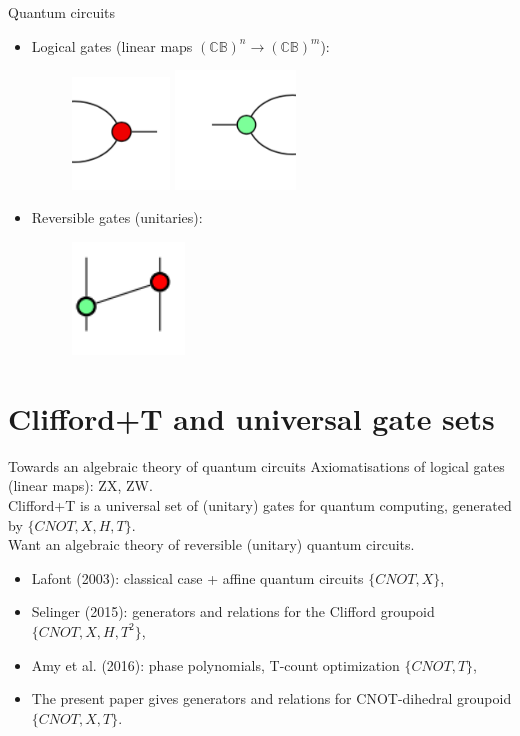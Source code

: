 \documentclass{beamer}
\theoremstyle{definition}
\begin{document}
\begin{frame}{Quantum circuits}
	\begin{itemize}
		\item Logical gates (linear maps $(\mathbb{CB})^n \rightarrow (\mathbb{CB})^m$):
		\begin{figure}
		\includegraphics[width=2.6cm]{images/IMG-redspider}
		\includegraphics[width=3.2cm]{images/IMG-greenspider}
		\centering
		\end{figure}
		\item Reversible gates (unitaries):
		\begin{figure}
		\includegraphics[angle=-90, width=3cm]{images/IMG-CNOT}
		\centering
		\end{figure}
	\end{itemize}
\end{frame}


\section{Clifford+T and universal gate sets}
\begin{frame}{Towards an algebraic theory of quantum circuits}
	Axiomatisations of logical gates (linear maps): ZX, ZW.\\
	Clifford+T is a universal set of (unitary) gates for quantum computing, generated by $\{CNOT, X, H, T \}$.\\
	Want an algebraic theory of reversible (unitary) quantum circuits.
	\begin{itemize}
		\item Lafont (2003): classical case + affine quantum circuits $\{ CNOT, X \}$,
		\item Selinger (2015): generators and relations for the Clifford groupoid $\{ CNOT, X, H, T^2\}$,
		\item Amy et al. (2016): phase polynomials, T-count optimization $\{ CNOT, T\}$,
		\item The present paper gives generators and relations for CNOT-dihedral groupoid $\{CNOT, X, T\}$.
	\end{itemize}
\end{frame}
\end{document}
